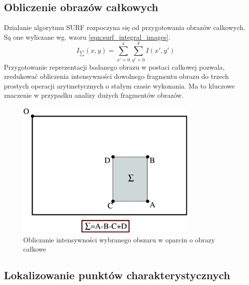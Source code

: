 \subsection{Obliczenie obrazów całkowych}
Działanie algorytmu SURF rozpoczyna się od przygotowania obrazów całkowych. Są one wyliczane wg. wzoru \ref{eqn:surf_integral_images}.
\begin{equation}
I_{\sum}(x,y) = \sum\limits_{x'=0}^{ x} \sum\limits_{y'=0}^{y} I(x',y')
\label{eqn:surf_integral_images}
\end{equation}
Przygotowanie reprezentacji badanego obrazu w postaci całkowej pozwala, zredukować obliczenia intensywności dowolnego fragmentu obrazu do trzech prostych operacji arytmetycznych o stałym czasie wykonania. Ma to kluczowe znaczenie w przypadku analizy dużych fragmentów obrazów.


\begin{figure}[!htb]
\centering
\includegraphics[width=0.8\textwidth]{pict/02/surf/surf_bay_integral_image.png}
\caption{Obliczanie intensywności wybranego obszaru w oparciu o obrazy całkowe}
\label{fig:surf_bay_integral_image}
\end{figure}



\subsection{Lokalizowanie punktów charakterystycznych}
